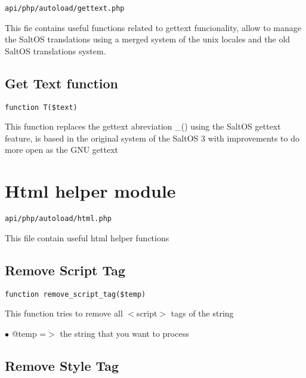 \documentclass[a4paper]{book}
\begin{document}
\begin{lstlisting}
api/php/autoload/gettext.php
\end{lstlisting}

This fie contains useful functions related to gettext funcionality, allow to manage the
SaltOS translations using a merged system of the unix locales and the old SaltOS translations
system.

\hypertarget{toc148}{}
\subsection{Get Text function}

\begin{lstlisting}
function T($text)
\end{lstlisting}

This function replaces the gettext abreviation \_() using the SaltOS gettext
feature, is based in the original system of the SaltOS 3 with improvements
to do more open as the GNU gettext

\hypertarget{toc149}{}
\section{Html helper module}

\begin{lstlisting}
api/php/autoload/html.php
\end{lstlisting}

This file contain useful html helper functions

\hypertarget{toc150}{}
\subsection{Remove Script Tag}

\begin{lstlisting}
function remove_script_tag($temp)
\end{lstlisting}

This function tries to remove all $<$script$>$ tags of the string

\begin{compactitem}
\item[\color{myblue}$\bullet$] @temp =$>$ the string that you want to process
\end{compactitem}

\hypertarget{toc151}{}
\subsection{Remove Style Tag}
\end{document}
